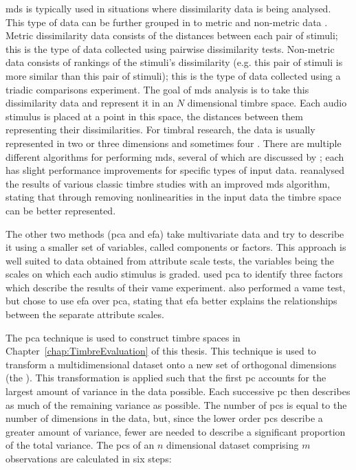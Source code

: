 		\acrshort{mds} is typically used in situations where dissimilarity data is being analysed. This type of
		data can be further grouped in to metric and non-metric data \citep{hair2013multivariate}. Metric
		dissimilarity data consists of the distances between each pair of stimuli; this is the type of data
		collected using pairwise dissimilarity tests. Non-metric data consists of rankings of the stimuli's
		dissimilarity (e.g. this pair of stimuli is more similar than this pair of stimuli); this is the type of
		data collected using a triadic comparisons experiment. The goal of \acrshort{mds} analysis is to take this
		dissimilarity data and represent it in an $N$ dimensional timbre space. Each audio stimulus is placed at a
		point in this space, the distances between them representing their dissimilarities. For timbral research,
		the data is usually represented in two \citep{giragama2003relating} or three \citep{grey1978perceptual}
		dimensions and sometimes four \citep{bernays2011verbal}. There are multiple different algorithms for
		performing \acrshort{mds}, several of which are discussed by \citet{mcadams1999perspectives}; each has
		slight performance improvements for specific types of input data. \citet{burgoyne2008a} reanalysed the
		results of various classic timbre studies with an improved \acrshort{mds} algorithm, stating that through
		removing nonlinearities in the input data the timbre space can be better represented.

		The other two methods (\acrshort{pca} and \acrshort{efa}) take multivariate data and try to describe it
		using a smaller set of variables, called components or factors. This approach is well suited to data
		obtained from attribute scale tests, the variables being the scales on which each audio stimulus is graded.
		\citet{kendall1993verbal1} used \acrshort{pca} to identify three factors which describe the results of
		their \acrshort{vame} experiment. \citet{zacharakis2012analysis} also performed a \acrshort{vame} test, but
		chose to use \acrshort{efa} over \acrshort{pca}, stating that \acrshort{efa} better explains the
		relationships between the separate attribute scales.

		The \acrshort{pca} technique is used to construct timbre spaces in Chapter~\ref{chap:TimbreEvaluation} of
		this thesis. This technique is used to transform a multidimensional dataset onto a new set of orthogonal
		dimensions (the ). This transformation is applied such that the first \acrshort{pc} accounts
		for the largest amount of variance in the data possible. Each successive \acrshort{pc} then describes as
		much of the remaining variance as possible. The number of \acrshort{pc}s is equal to the number of
		dimensions in the data, but, since the lower order \acrshort{pc}s describe a greater amount of variance,
		fewer are needed to describe a significant proportion of the total variance. The \acrshort{pc}s
		of an $n$ dimensional dataset comprising $m$ observations are calculated in six steps:

